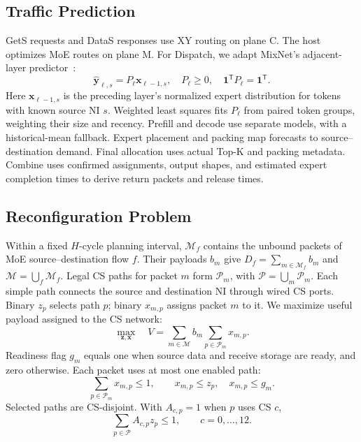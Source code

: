 \subsection{Traffic Prediction}
\label{sec:traffic-prediction}

GetS requests and DataS responses use XY routing on plane C. The host
optimizes MoE routes on plane M. For Dispatch, we adapt MixNet's
adjacent-layer predictor~\cite{liao2025mixnet}:
\begin{equation}
  \widehat{\mathbf y}_{\ell,s}=P_\ell\mathbf x_{\ell-1,s},
  \quad P_\ell\geq0,\quad
  \mathbf1^{\mathsf T}P_\ell=\mathbf1^{\mathsf T}.
  \label{eq:noc-load-prediction}
\end{equation}
Here $\mathbf x_{\ell-1,s}$ is the preceding layer's normalized expert distribution
for tokens with known source NI $s$. Weighted least squares fits $P_\ell$
from paired token groups, weighting their size and recency. Prefill and
decode use separate models, with a historical-mean fallback.
Expert placement and packing map forecasts to source--destination
demand. Final allocation uses actual Top-K and packing metadata.
Combine uses confirmed assignments, output shapes, and estimated
expert completion times to derive return packets and release times.

\subsection{Reconfiguration Problem}
\label{sec:noc-problem}

Within a fixed $H$-cycle planning interval, $\mathcal M_f$ contains
the unbound packets of MoE source--destination flow $f$.
Their payloads $b_m$ give $D_f=\sum_{m\in\mathcal M_f}b_m$ and
$\mathcal M=\bigcup_f\mathcal M_f$. Legal CS paths for packet $m$
form $\mathcal P_m$, with $\mathcal P=\bigcup_m\mathcal P_m$.
Each simple path connects the source and destination NI through wired
CS ports. Binary $z_p$ selects path $p$;
binary $x_{m,p}$ assigns packet $m$ to it. We maximize useful payload
assigned to the CS network:
\begin{equation}
  \max_{\mathbf z,\mathbf x}\quad
  V=\sum_{m\in\mathcal M}b_m\sum_{p\in\mathcal P_m}x_{m,p}.
  \label{eq:noc-volume-objective}
\end{equation}
Readiness flag $g_m$ equals one when source data and receive storage
are ready, and zero otherwise. Each packet uses at most one enabled path:
\begin{equation}
  \sum_{p\in\mathcal P_m}x_{m,p}\leq1,
  \qquad x_{m,p}\leq z_p,\quad x_{m,p}\leq g_m.
  \label{eq:noc-packet-assignment}
\end{equation}
Selected paths are CS-disjoint. With $A_{c,p}=1$ when $p$ uses CS $c$,
\begin{equation}
  \sum_{p\in\mathcal P}A_{c,p}z_p\leq1,
  \qquad c=0,\ldots,12.
  \label{eq:noc-cs-exclusion}
\end{equation}

